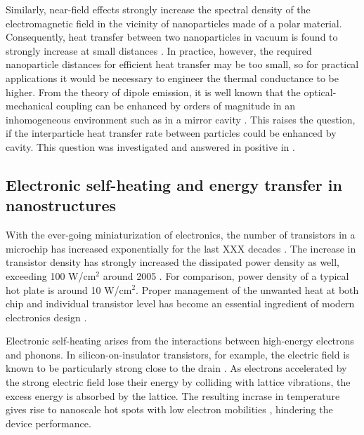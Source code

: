 Similarly, near-field effects strongly increase the spectral density of the electromagnetic field in the vicinity of nanoparticles made of a polar material. Consequently, heat transfer between two nanoparticles in vacuum is found to strongly increase at small distances \cite{domingues05}. In practice, however, the required nanoparticle distances for efficient heat transfer may be too small, so for practical applications it would be necessary to engineer the thermal conductance to be higher. From the theory of dipole emission, it is well known that the optical-mechanical coupling can be enhanced by orders of magnitude in an inhomogeneous environment such as in a mirror cavity \cite{novotny}. This raises the question, if the interparticle heat transfer rate between particles could be enhanced by cavity. This question was investigated and answered in positive in .


\subsection{Electronic self-heating and energy transfer in nanostructures}
\label{sec:intro_electrons}

With the ever-going miniaturization of electronics, the number of transistors in a microchip has increased exponentially for the last XXX decades \cite{}. The increase in transistor density has strongly increased the dissipated power density as well, exceeding 100 W/cm$^2$ around 2005 \cite{pop10}. For comparison, power density of a typical hot plate is around 10 W/cm$^2$. Proper management of the unwanted heat at both chip and individual transistor level has become an essential ingredient of modern electronics design \cite{pop06_ieee}.

Electronic self-heating arises from the interactions between high-energy electrons and phonons. In silicon-on-insulator transistors, for example, the electric field is known to be particularly strong close to the drain \cite{pop06_ieee}. As electrons accelerated by the strong electric field lose their energy by colliding with lattice vibrations, the excess energy is absorbed by the lattice. The resulting incrase in temperature gives rise to nanoscale hot spots with low electron mobilities \cite{pop06_ieee}, hindering the device performance. %


